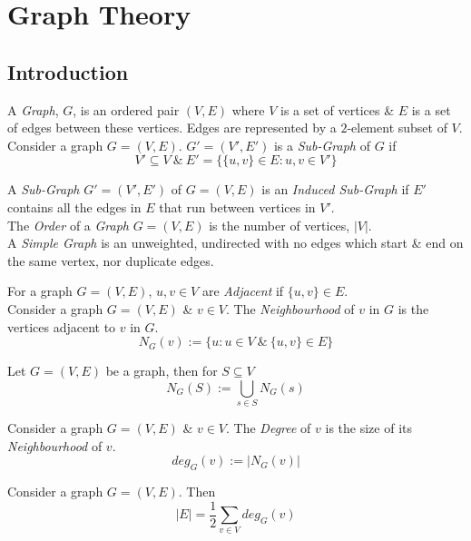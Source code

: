 \documentclass[11pt,a4paper]{article}
\begin{document}
\section{Graph Theory}

\subsection{Introduction}

A \textit{Graph}, $G$, is an ordered pair $(V,E)$ where $V$ is a set of vertices \& $E$ is a set of edges between these vertices. Edges are represented by a $2$-element subset of $V$.\\

Consider a graph $G=(V,E)$. $G'=(V',E')$ is a \textit{Sub-Graph} of $G$ if
$$V'\subseteq V\ \&\ E'=\{\{u,v\}\in E:u,v\in V'\}$$

A \textit{Sub-Graph} $G'=(V',E')$ of $G=(V,E)$ is an \textit{Induced Sub-Graph} if $E'$ contains all the edges in $E$ that run between vertices in $V'$.\\

The \textit{Order} of a \textit{Graph} $G=(V,E)$ is the number of vertices, $|V|$.\\

A \textit{Simple Graph} is an unweighted, undirected with no edges which start \& end on the same vertex, nor duplicate edges.\\


For a graph $G=(V,E)$, $u,v\in V$ are \textit{Adjacent} if $\{u,v\}\in E$.\\

Consider a graph $G=(V,E)$ \& $v\in V$. The \textit{Neighbourhood} of $v$ in $G$ is the vertices adjacent to $v$ in $G$.
$$N_G(v):=\big\{u:u\in V\ \&\ \{u,v\}\in E\big\}$$

Let $G=(V,E)$ be a graph, then for $S\subseteq V$
$$N_G(S):=\bigcup_{s\in S}N_G(s)$$

Consider a graph $G=(V,E)$ \& $v\in V$. The \textit{Degree} of $v$ is the size of its \textit{Neighbourhood} of $v$.
$$deg_G(v):=|N_G(v)|$$

Consider a graph $G=(V,E)$. Then
$$|E|=\frac{1}{2}\sum_{v\in V}deg_G(v)$$
\end{document}
